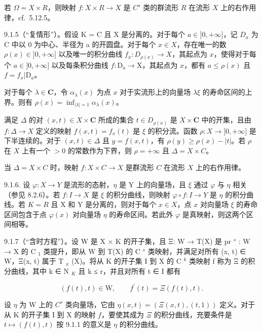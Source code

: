 若 \(\Omega = X \times R\)，则映射 \(f: X \times R \to X\) 是 \(C^s\) 类的群流形 \(R\) 在流形 \(X\) 上的右作用律，cf.~5.12.5。

9.1.5（“复情形”）。假设 K = C 且 X 是分离的。对于每个 \(a \in ]0, +\infty]\)，记 \(D_a\) 为 C 中以 0 为中心、半径为 a 的开圆盘。对于每个 \(x \in X\)，存在唯一的数 \(\rho(x) \in ]0, +\infty]\) 以及唯一的积分曲线 \(f_x: D_{\rho(x)} \to X\)，其起点为 \(x\)，使得对于每个 \(a \in ]0, +\infty]\) 以及每条积分曲线 \(f: \mathrm{D}_a \to \mathrm{X}\)，其起点为 \(x\)，都有 \(a \leqslant \rho(x)\) 且 \(f = f_x | \mathrm{D}_a\)。

对于每个 \(\lambda\in\mathbf{C}\)，令 \(\alpha_{\lambda}(x)\) 为点 \(x\) 对于实流形上的向量场 \(\lambda\xi\) 的寿命区间的上界。则有 \(\rho(x)=\inf_{|\lambda|=1}\alpha_{\lambda}(x)\)。

满足 \(\Delta\) 的对 \((x,t)\in X\times\mathbf{C}\) 所成的集合 \(t\in D_{\rho(x)}\) 是 \(X\times\mathbf{C}\) 中的开集，且由 \(f:\Delta\to X\) 定义的映射 \(f(x,t)=f_x(t)\) 是 \(\xi\) 的积分流。函数 \(\rho:X\to ]0,+\infty]\) 是下半连续的。对于 \((x,t)\in\Delta\) 且 \(y=f(x,t)\)，有 \(\rho(y)\geqslant\rho(x)-|t|\)。若 \(\rho\) 在 \(X\) 上有一个 \(>0\) 的常数作为下界，则 \(\rho = +\infty\) 且 \(\Delta = X \times C\)。

当 \(\Delta = X \times C\) 时，映射 \(f: X \times C \to X\) 是群流形 \(C\) 在流形 \(X\) 上的右作用律。

9.1.6. 设 \(\varphi: X \to Y\) 是流形的态射，\(\eta\) 是 Y 上的向量场，且 \(\xi\) 通过 \(\varphi\) 与 \(\eta\) 相关（参见 8.2.6）。若 \(f: I \to X\) 是 \(\xi\) 的积分曲线，则映射 \(\varphi \circ f: I \to Y\) 是 \(\eta\) 的积分曲线。若 \(K = R\) 且 X 和 Y 是分离的，则对于每个 \(x \in X\)，点 \(x\) 对向量场 \(\xi\) 的寿命区间包含于点 \(\varphi(x)\) 对向量场 \(\eta\) 的寿命区间。若此外 \(\varphi\) 是真映射，则这两个区间相等。

9.1.7（“含时方程”）。设 W 是 X × K 的开子集，且 Ξ: W → T(X) 是 pr \(^{s}\) : W → X 的 C \(_{1}\) 类提升，即从 W 到 T(X) 的 C \(^{s}\) 类映射，并满足对所有 (x, t) ∈ W，Ξ(x, t) 属于 T \(_{x}\) (X)。将从 K 的开子集 I 到 X 的 C \(^{k}\) 类映射 f 称为 Ξ 的积分曲线，其中 k ∈ N \(_{K}\) 且 k ≤ r，并且对所有 t ∈ I 都有

\[
(f (t), t) \in \mathrm{W},\qquad f ^ {\prime} (t) = \Xi (f (t), t).
\]

设 \(\eta\) 为 W 上的 \(C^s\) 类向量场，它由 \(\eta(x, t) = (\Xi(x, t), (t, 1))\) 定义。对于从 K 的开子集 I 到 X 的映射 \(f\)，要使其成为 \(\Xi\) 的积分曲线，充要条件是 \(t \mapsto (f(t), t)\) 按 9.1.1 的意义是 \(\eta\) 的积分曲线。

